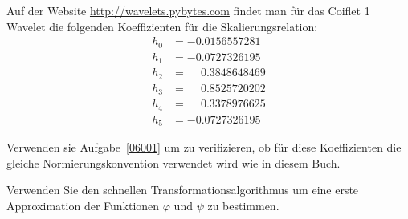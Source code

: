 Auf der Website \url{http://wavelets.pybytes.com} findet man für das
Coiflet 1 Wavelet die folgenden Koeffizienten für die Skalierungsrelation:
\begin{align*}
h_0 &= -0.0156557281\\
h_1 &= -0.0727326195\\
h_2 &= \phantom{-} 0.3848648469\\
h_3 &= \phantom{-} 0.8525720202\\
h_4 &= \phantom{-} 0.3378976625\\
h_5 &= -0.0727326195
\end{align*}
\begin{teilaufgaben}
\item
Verwenden sie Aufgabe~\ref{06001} um zu verifizieren, ob für diese
Koeffizienten die gleiche Normierungskonvention verwendet wird wie in
diesem Buch.
\item
Verwenden Sie den schnellen Transformationsalgorithmus um eine 
erste Approximation der Funktionen $\varphi$ und $\psi$ zu bestimmen.
\end{teilaufgaben}

